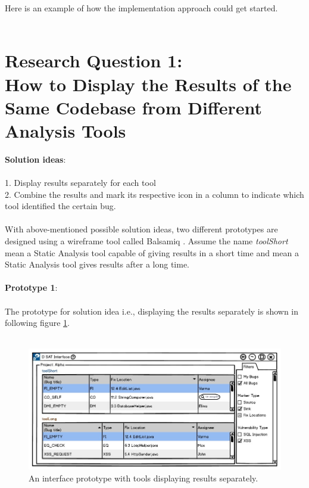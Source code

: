 Here is an example of how the implementation approach could get started. \\ \\

\section{Research Question 1: \\ How to Display the Results of the Same Codebase from Different Analysis Tools} 


\textbf{Solution ideas}: \\ \\
1. Display results separately for each tool \\
2. Combine the results and mark its respective icon in a column to indicate which tool identified the certain bug. \\ \\

With above-mentioned possible solution ideas, two different prototypes are designed using a wireframe tool called Balsamiq \cite{B}. Assume the name \textit{toolShort} mean a Static Analysis tool capable of giving results in a short time and  mean a Static Analysis tool gives results after a long time. \\ \\

\textbf{Prototype 1}: \\ \\

The prototype for solution idea i.e., displaying the results separately is shown in following figure \ref{fig:toolSeperate}. \\ \\

\begin{figure}[hbt!]
	\centering
	\includegraphics[width=\linewidth]{figures/d_seperate}
	\caption{An interface prototype with tools displaying results separately.}
	\label{fig:toolSeperate}
\end{figure}


